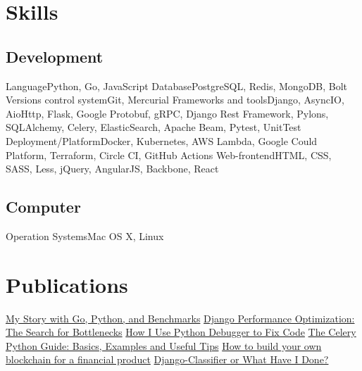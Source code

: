 \documentclass[11pt,a4paper,oneside]{moderncv}
\begin{document}
    \maketitle

    \section{Skills}
        \subsection{Development}
            \cvline
                {Language}{Python, Go, JavaScript}
            \cvline
                {Database}{PostgreSQL, Redis, MongoDB, Bolt}
            \cvline
                {Versions control system}{Git, Mercurial}
            \cvline
                {Frameworks and tools}{Django, AsyncIO, AioHttp, Flask, Google Protobuf, gRPC, Django Rest Framework, Pylons, SQLAlchemy, Celery, ElasticSearch, Apache Beam, Pytest, UnitTest}
            \cvline
                {Deployment/Platform}{Docker, Kubernetes, AWS Lambda, Google Could Platform, Terraform, Circle CI, GitHub Actions}
            \cvline
                {Web-frontend}{HTML, CSS, SASS, Less, jQuery, AngularJS, Backbone, React}

        \subsection{Computer}
            \cvline
                {Operation Systems}{Mac OS X, Linux}



    \section{Publications}
        \cvlistitem
            {\href{https://djangostars.com/blog/my-story-with-golang/}{My Story with Go, Python, and Benchmarks}}
        \cvlistitem
            {\href{https://medium.com/free-code-camp/django-performance-optimization-looking-for-the-bottlenecks-8583789e341b}{Django Performance Optimization: The Search for Bottlenecks}}
        \cvlistitem
            {\href{https://codeburst.io/how-i-use-python-debugger-to-fix-code-279f11f75866}{How I Use Python Debugger to Fix Code}}
        \cvlistitem
            {\href{https://codeburst.io/the-celery-python-guide-basics-examples-and-useful-tips-d8da1fcfaea3}{The Celery Python Guide: Basics, Examples and Useful Tips}}
        \cvlistitem
            {\href{https://djangostars.com/blog/how-to-build-your-own-blockchain-for-a-financial-product/}{How to build your own blockchain for a financial product}}
        \cvlistitem
            {\href{https://medium.com/free-code-camp/django-classifier-or-what-have-i-done-4a8164358c09}{Django-Classifier or What Have I Done?}}
\end{document}
